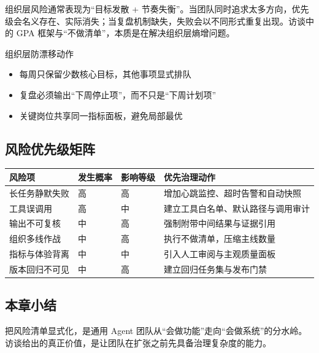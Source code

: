 组织层风险通常表现为“目标发散 + 节奏失衡”。当团队同时追求太多方向，优先级会名义存在、实际消失；当复盘机制缺失，失败会以不同形式重复出现。访谈中的 GPA 框架与“不做清单”，本质是在解决组织层熵增问题。

\begin{importantbox}{组织层防漂移动作}
\begin{itemize}
    \item 每周只保留少数核心目标，其他事项显式排队
    \item 复盘必须输出“下周停止项”，而不只是“下周计划项”
    \item 关键岗位共享同一指标面板，避免局部最优
\end{itemize}
\end{importantbox}

\subsection{风险优先级矩阵}

\begin{center}
\begin{tabular}{p{3.2cm}p{2.1cm}p{2.1cm}p{5.4cm}}
\toprule
风险项 & 发生概率 & 影响等级 & 优先治理动作 \\
\midrule
长任务静默失败 & 高 & 高 & 增加心跳监控、超时告警和自动快照 \\
工具误调用 & 高 & 中 & 建立工具白名单、默认路径与调用审计 \\
输出不可复核 & 中 & 高 & 强制附带中间结果与证据引用 \\
组织多线作战 & 中 & 高 & 执行不做清单，压缩主线数量 \\
指标与体验背离 & 中 & 中 & 引入人工审阅与主观质量面板 \\
版本回归不可见 & 中 & 高 & 建立回归任务集与发布门禁 \\
\bottomrule
\end{tabular}
\end{center}

\subsection{本章小结}

把风险清单显式化，是通用 Agent 团队从“会做功能”走向“会做系统”的分水岭。访谈给出的真正价值，是让团队在扩张之前先具备治理复杂度的能力。



